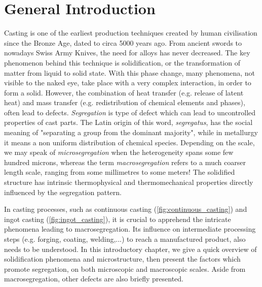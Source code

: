 \chapter{General Introduction}
Casting is one of the earliest production techniques created by human civilisation since the Bronze Age, dated to circa 5000 years ago. 
From ancient swords to nowadays Swiss Army Knives, the need for alloys has never decreased.
The key phenomenon behind this technique is solidification, or the transformation of matter from liquid to solid state. With this phase change, 
many phenomena, not visible to the naked eye, take place with a very complex interaction, in order to form a solid. 
However, the combination of heat transfer (e.g. release of latent heat) and mass transfer (e.g. redistribution of chemical
elements and phases), often lead to defects. \emph{Segregation} is type of defect which can lead to uncontrolled properties of cast parts. 
The Latin origin of this word, \emph{segregatus}, has the social meaning of "separating a group from the dominant majority", while 
in metallurgy it means a non uniform distribution of chemical species. Depending on the scale, we may speak of \emph{microsegregation}
when the heterogeneity spans some few hundred microns, whereas the term \emph{macrosegregation} refers to a much coarser length scale, ranging
from some millimetres to some meters! The solidified structure has intrinsic thermophysical and thermomechanical properties directly influenced by the segregation pattern. 

In casting processes, such as continuous casting (\cref{fig:continuous_casting}) and ingot casting (\cref{fig:ingot_casting}), it is crucial to apprehend 
the intricate phenomena leading to macrosegregation. Its influence on intermediate processing steps (e.g. forging, coating, welding,...)
to reach a manufactured product, also needs to be understood.
In this introductory chapter, we give a quick overview of solidification phenomena and microstructure, then present the factors which
promote segregation, on both microscopic and macroscopic scales. Aside from macrosegregation, other defects are also briefly presented.

